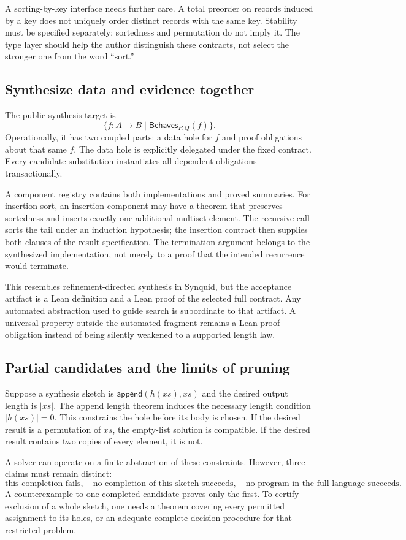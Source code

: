 \documentclass[11pt,letterpaper]{article}
\theoremstyle{definition}\newtheorem{definition}[theorem]{Definition}
\begin{document}
A sorting-by-key interface needs further care. A total preorder on records induced by a key does not uniquely order distinct records with the same key. Stability must be specified separately; sortedness and permutation do not imply it. The type layer should help the author distinguish these contracts, not select the stronger one from the word ``sort.''

\subsection{Synthesize data and evidence together}
The public synthesis target is
\[
 \{f:A\to B\mid \mathsf{Behaves}_{P,Q}(f)\}.
\]
Operationally, it has two coupled parts: a data hole for $f$ and proof obligations about that same $f$. The data hole is explicitly delegated under the fixed contract. Every candidate substitution instantiates all dependent obligations transactionally.

A component registry contains both implementations and proved summaries. For insertion sort, an insertion component may have a theorem that preserves sortedness and inserts exactly one additional multiset element. The recursive call sorts the tail under an induction hypothesis; the insertion contract then supplies both clauses of the result specification. The termination argument belongs to the synthesized implementation, not merely to a proof that the intended recurrence would terminate.

This resembles refinement-directed synthesis in Synquid, but the acceptance artifact is a Lean definition and a Lean proof of the selected full contract. Any automated abstraction used to guide search is subordinate to that artifact. A universal property outside the automated fragment remains a Lean proof obligation instead of being silently weakened to a supported length law.

\subsection{Partial candidates and the limits of pruning}
Suppose a synthesis sketch is $\mathsf{append}(h(xs),xs)$ and the desired output length is $|xs|$. The append length theorem induces the necessary length condition $|h(xs)|=0$. This constrains the hole before its body is chosen. If the desired result is a permutation of $xs$, the empty-list solution is compatible. If the desired result contains two copies of every element, it is not.

A solver can operate on a finite abstraction of these constraints. However, three claims must remain distinct:
\[
 \text{this completion fails},\quad
 \text{no completion of this sketch succeeds},\quad
 \text{no program in the full language succeeds}.
\]
A counterexample to one completed candidate proves only the first. To certify exclusion of a whole sketch, one needs a theorem covering every permitted assignment to its holes, or an adequate complete decision procedure for that restricted problem.
\end{document}
